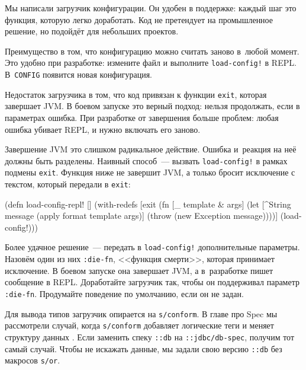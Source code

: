 Мы написали загрузчик конфигурации. Он удобен в поддержке: каждый шаг это
функция, которую легко доработать. Код не претендует на промышленное решение, но
подойдёт для небольших проектов.

Преимущество в том, что конфигурацию можно считать заново в~любой момент. Это
удобно при разработке: измените файл и выполните \verb|load-config!| в
REPL. В~\verb|CONFIG| появится новая конфигурация.


Недостаток загрузчика в том, что код привязан к функции \verb|exit|, которая
завершает JVM. В боевом запуске это верный подход: нельзя продолжать, если в
параметрах ошибка. При разработке от завершения больше проблем: любая ошибка
убивает REPL, и нужно включать его заново.

Завершение JVM это слишком радикальное действие. Ошибка и~реакция на неё
должны быть разделены. Наивный способ~--- вызвать \verb|load-config!| в рамках
подмены \verb|exit|. Функция ниже не завершит JVM, а только бросит исключение
с текстом, который передали в \verb|exit|:

\begin{english}
  \begin{clojure}
(defn load-config-repl! []
  (with-redefs
    [exit (fn [_ template & args]
            (let [^String message
                  (apply format template args)]
              (throw (new Exception message))))]
    (load-config!)))
  \end{clojure}
\end{english}


Более удачное решение~--- передать в \verb|load-config!| дополнительные
параметры. Назовём один из них \verb|:die-fn|, <<функция смерти>>, которая
принимает исключение. В боевом запуске она завершает JVM, а в~разработке пишет
сообщение в REPL. Доработайте загрузчик так, чтобы он поддерживал параметр
\verb|:die-fn|. Продумайте поведение по умолчанию, если он не задан.

Для вывода типов загрузчик опирается на \verb|s/conform|. В главе про Spec мы
рассмотрели случай, когда \verb|s/conform| добавляет логические теги и меняет
структуру данных . Если заменить спеку \verb|::db| на
\verb|::jdbc/db-spec|, получим тот самый случай. Чтобы не искажать данные, мы
задали свою версию \verb|::db| без макросов \verb|s/or|.



